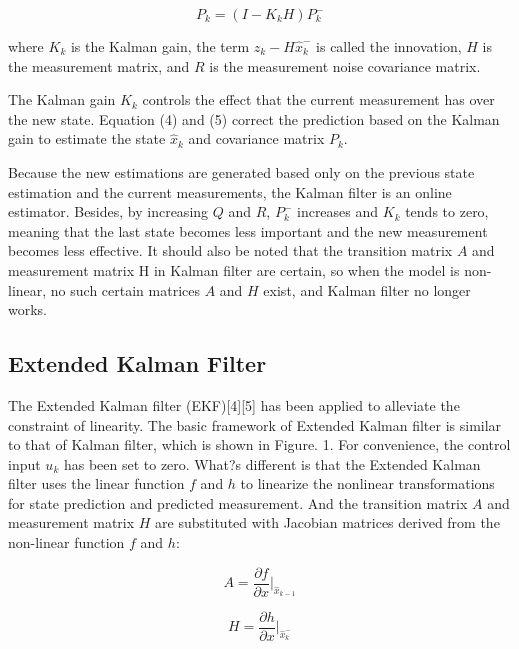\documentclass[10pt,twocolumn,letterpaper]{article}
\begin{document}
\begin{equation}
P_k=(I-K_kH)P_k^-
\end{equation}

where $K_k$ is the Kalman gain, the term $z_k-H\hat{x}_k^-$ is called the innovation, $H$ is the measurement matrix, and $R$ is the measurement noise covariance matrix.

The Kalman gain $K_k$ controls the effect that the current measurement has over the new state. Equation (4) and (5) correct the prediction based on the Kalman gain to estimate the state $\hat{x}_k$ and covariance matrix $P_k$.

Because the new estimations are generated based only on the previous state estimation and the current measurements, the Kalman filter is an online estimator. Besides, by increasing $Q$ and $R$, $P_k^-$ increases and $K_k$ tends to zero, meaning that the last state becomes less important and the new measurement becomes less effective. It should also be noted that the transition matrix $A$ and measurement matrix H in Kalman filter are certain, so when the model is non-linear, no such certain matrices $A$ and $H$ exist, and Kalman filter no longer works.

\subsection{Extended Kalman Filter}

The Extended Kalman filter (EKF)[4][5] has been applied to alleviate the constraint of linearity. The basic framework of Extended Kalman filter is similar to that of Kalman filter, which is shown in Figure. 1. For convenience, the control input $u_k$ has been set to zero. What?s different is that the Extended Kalman filter uses the linear function $f$ and $h$ to linearize the nonlinear transformations for state prediction and predicted measurement. And the transition matrix $A$ and measurement matrix $H$ are substituted with Jacobian matrices derived from the non-linear function $f$ and $h$:

\begin{equation}
A=\frac{\partial f}{\partial x}|_{\hat{x}_{k-1}}
\end{equation}

\begin{equation}
H=\frac{\partial h}{\partial x}|_{\hat{x}_k^-}
\end{equation}
\end{document}
